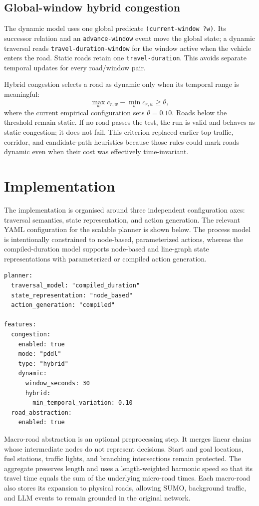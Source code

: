 \documentclass[10pt]{article}
\begin{document}
\subsection{Global-window hybrid congestion}
The dynamic model uses one global predicate \texttt{(current-window ?w)}. Its
successor relation and an \texttt{advance-window} event move the global state;
a dynamic traversal reads \texttt{travel-duration-window} for the window active
when the vehicle enters the road. Static roads retain one
\texttt{travel-duration}. This avoids separate temporal updates for every
road/window pair.

Hybrid congestion selects a road as dynamic only when its temporal range is
meaningful:
\[
  \max_w c_{r,w} - \min_w c_{r,w} \geq \theta,
\]
where the current empirical configuration sets $\theta=0.10$. Roads below the
threshold remain static. If no road passes the test, the run is valid and
behaves as static congestion; it does not fail. This criterion replaced earlier
top-traffic, corridor, and candidate-path heuristics because those rules could
mark roads dynamic even when their cost was effectively time-invariant.

\section{Implementation}
The implementation is organised around three independent configuration axes:
traversal semantics, state representation, and action generation. The relevant
YAML configuration for the scalable planner is shown below. The process model
is intentionally constrained to node-based, parameterized actions, whereas the
compiled-duration model supports node-based and line-graph state
representations with parameterized or compiled action generation.

\begin{lstlisting}
planner:
  traversal_model: "compiled_duration"
  state_representation: "node_based"
  action_generation: "compiled"

features:
  congestion:
    enabled: true
    mode: "pddl"
    type: "hybrid"
    dynamic:
      window_seconds: 30
      hybrid:
        min_temporal_variation: 0.10
  road_abstraction:
    enabled: true
\end{lstlisting}

Macro-road abstraction is an optional preprocessing step. It merges linear
chains whose intermediate nodes do not represent decisions. Start and goal
locations, fuel stations, traffic lights, and branching intersections remain
protected. The aggregate preserves length and uses a length-weighted harmonic
speed so that its travel time equals the sum of the underlying micro-road
times. Each macro-road also stores its expansion to physical roads, allowing
SUMO, background traffic, and LLM events to remain grounded in the original
network.
\end{document}
